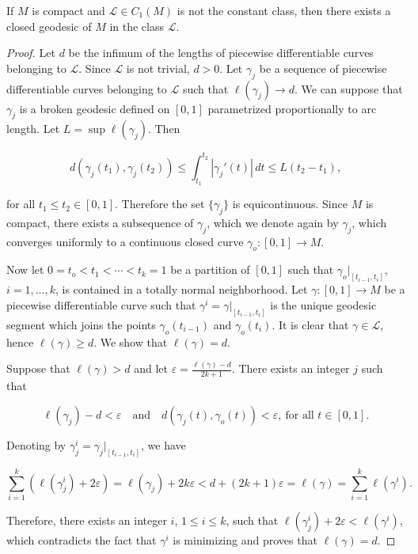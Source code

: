 \begin{theorem}[Cartan]
  \label{thm:dc-ch12-2-2}
  If $M$ is compact and $\mathcal{L}\in C_1(M)$ is not the constant class, then
  there exists a closed geodesic of $M$ in the class $\mathcal{L}$.
\end{theorem}
\begin{proof}
  Let $d$ be the infimum of the lengths of piecewise differentiable curves
  belonging to $\mathcal{L}$. Since $\mathcal{L}$ is not trivial, $d>0$. Let
  $\gamma_j$ be a sequence of piecewise differentiable curves belonging to
  $\mathcal{L}$ such that $\ell(\gamma_j)\to d$. We can suppose that $\gamma_j$ is a
  broken geodesic defined on $[0,1]$ parametrized proportionally to arc length. Let
  $L=\sup\ell(\gamma_j)$. Then
  
  $$
  d(\gamma_j(t_1),\gamma_j(t_2))\leq\int_{t_1}^{t_2}|\gamma_j'(t)|\,dt\leq L(t_2-t_1),
  $$
  
  for all $t_1\leq t_2\in[0,1]$. Therefore the set $\{\gamma_j\}$ is equicontinuous.
  Since $M$ is compact, there exists a subsequence of $\gamma_j$, which we denote
  again by $\gamma_j$, which converges uniformly to a continuous closed curve
  $\gamma_o:[0,1]\to M$.
  
  Now let $0=t_o<t_1<\cdots<t_k=1$ be a partition of $[0,1]$ such that
  $\gamma_o|_{[t_{i-1},t_i]}$, $i=1,\dots,k$, is contained in a totally normal
  neighborhood. Let $\gamma:[0,1]\to M$ be a piecewise differentiable curve such
  that $\gamma^i=\gamma|_{[t_{i-1},t_i]}$ is the unique geodesic segment which joins
  the points $\gamma_o(t_{i-1})$ and $\gamma_o(t_i)$. It is clear that
  $\gamma\in\mathcal{L}$, hence $\ell(\gamma)\geq d$. We show that $\ell(\gamma)=d$.
  
  Suppose that $\ell(\gamma)>d$ and let $\varepsilon=\frac{\ell(\gamma)-d}{2k+1}$.
  There exists an integer $j$ such that
  
  $$
  \ell(\gamma_j)-d<\varepsilon\quad\text{and}\quad d(\gamma_j(t),\gamma_o(t))<\varepsilon,\ \text{for all }t\in[0,1].
  $$
  
  Denoting by $\gamma_j^i=\gamma_j|_{[t_{i-1},t_i]}$, we have
  
  $$
  \sum_{i=1}^k(\ell(\gamma_j^i)+2\varepsilon)=\ell(\gamma_j)+2k\varepsilon<d+(2k+1)\varepsilon=\ell(\gamma)=\sum_{i=1}^k\ell(\gamma^i).
  $$
  
  Therefore, there exists an integer $i$, $1\leq i\leq k$, such that
  $\ell(\gamma_j^i)+2\varepsilon<\ell(\gamma^i)$, which contradicts the fact that
  $\gamma^i$ is minimizing and proves that $\ell(\gamma)=d$.
  

\end{proof}
